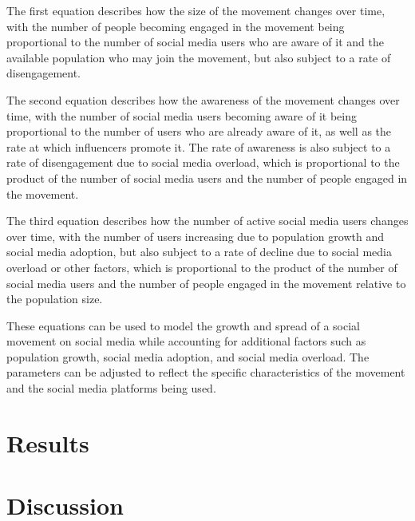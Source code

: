 \documentclass{article}
\begin{document}
        The first equation describes how the size of the movement changes over time, with the number of people becoming engaged in the movement being proportional to the number of social media users who are aware of it and the available population who may join the movement, but also subject to a rate of disengagement.
        
        The second equation describes how the awareness of the movement changes over time, with the number of social media users becoming aware of it being proportional to the number of users who are already aware of it, as well as the rate at which influencers promote it. The rate of awareness is also subject to a rate of disengagement due to social media overload, which is proportional to the product of the number of social media users and the number of people engaged in the movement.
        
        The third equation describes how the number of active social media users changes over time, with the number of users increasing due to population growth and social media adoption, but also subject to a rate of decline due to social media overload or other factors, which is proportional to the product of the number of social media users and the number of people engaged in the movement relative to the population size.
        
        These equations can be used to model the growth and spread of a social movement on social media while accounting for additional factors such as population growth, social media adoption, and social media overload. The parameters can be adjusted to reflect the specific characteristics of the movement and the social media platforms being used.
    \section{Results}
    \section{Discussion}
    \newpage
    
    
    
\end{document}
